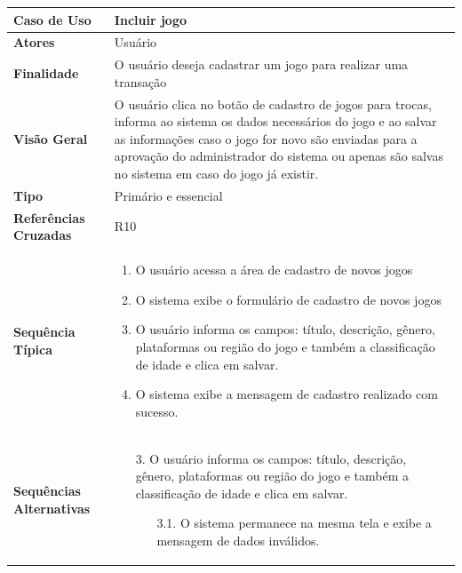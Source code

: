 \documentclass[a4paper,11pt]{article}
\begin{document}
\begin{table}[H]
		\begin{tabularx}{\textwidth}{|l|X|}
		\hline
			\textbf{Caso de Uso} &  Incluir jogo \\ \hline
			\textbf{Atores} &  Usuário \\ \hline
			\textbf{Finalidade} &  O usuário deseja cadastrar um jogo para realizar uma transação \\ \hline
			\textbf{Visão Geral} &  O usuário clica no botão de cadastro de jogos para trocas, informa ao sistema os dados necessários do jogo e ao salvar as informações caso o jogo for novo são enviadas para a aprovação do administrador do sistema ou apenas são salvas no sistema em caso do jogo já existir. \\ \hline
			\textbf{Tipo} & Primário e essencial \\ \hline
			\textbf{Referências Cruzadas} & R10 \\ \hline
			\textbf{Sequência Típica} & 
			\begin{enumerate}
			\item O usuário acessa a área de cadastro de novos jogos
			\item O sistema exibe o formulário de cadastro de novos jogos
			\item O usuário informa os campos: título, descrição, gênero, plataformas ou região do jogo e também a classificação de idade e clica em salvar.
			\item O sistema exibe a mensagem de cadastro realizado com sucesso.
						
			
			\end{enumerate} \\ \hline
			\textbf{Sequências Alternativas} & 
			\begin{itemize}
				\item[3.] O usuário informa os campos: título, descrição, gênero, plataformas ou região do jogo e também a classificação de idade e clica em salvar.
				\begin{itemize}
					\item[3.1.] O sistema permanece na mesma tela e exibe a mensagem de dados inválidos.
				\end{itemize}
			\end{itemize} \\ \hline
		\end{tabularx}
\end{table}
\end{document}
